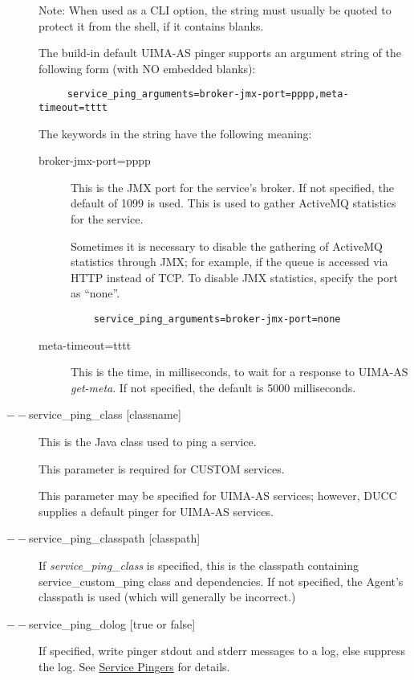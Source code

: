 \begin{description}
        Note: When used as a CLI option, the string must usually be
        quoted to protect it from the shell, if it contains blanks.

        The build-in default UIMA-AS pinger supports an argument string of the following form
        (with NO embedded blanks):
\begin{verbatim}
     service_ping_arguments=broker-jmx-port=pppp,meta-timeout=tttt
\end{verbatim}
        
        The keywords in the string have the following meaning:
        \begin{description}
          \item[broker-jmx-port=pppp] This is the JMX port for the service's broker.  If not
            specified, the default of 1099 is used.  This is used to gather ActiveMQ statistics
            for the service.

            Sometimes it is necessary to disable the gathering of ActiveMQ statistics through
            JMX; for example, if the queue is accessed via HTTP instead of TCP.  To disable
            JMX statistics, specify the port as ``none''.
\begin{verbatim}
    service_ping_arguments=broker-jmx-port=none
\end{verbatim}
          \item[meta-timeout=tttt] This is the time, in milliseconds, to wait for a response
            to UIMA-AS {\em get-meta}.  If not specified, the default is 5000 milliseconds.
        \end{description}
      
      \item[$--$service\_ping\_class {[classname]}] This is the Java class used to ping a service. 

        This parameter is required for CUSTOM services.

        This parameter may be specified for UIMA-AS services; however, DUCC supplies a default
        pinger for UIMA-AS services.

      \item[$--$service\_ping\_classpath {[classpath]}] If {\em service\_ping\_class} is specified,
        this is the classpath containing service\_custom\_ping class and dependencies.  If not
        specified, the Agent's classpath is used (which will generally be incorrect.)
      
      \item[$--$service\_ping\_dolog {[true or false]}] If specified, write pinger stdout and stderr
        messages to a log, else suppress the log. See \hyperref[sec:service.pingers]{Service Pingers}
        for details.


\end{description}
